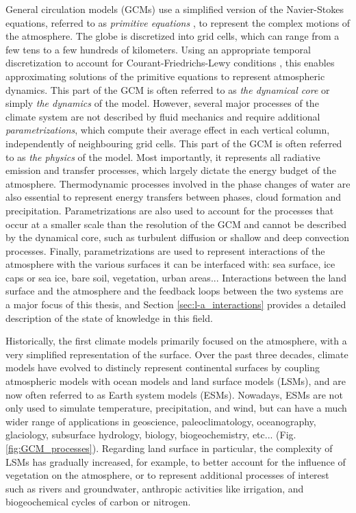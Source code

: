 General circulation models (GCMs) use a simplified version of the Navier-Stokes equations, referred to as \textit{primitive equations} \citep[initially formulated in ][]{bjerknes1910}, to represent the complex motions of the atmosphere. 
The globe is discretized into grid cells, which can range from a few tens to a few hundreds of kilometers. Using an appropriate temporal discretization to account for Courant-Friedrichs-Lewy conditions \citep{courant_partial_1967}, this enables approximating solutions of the primitive equations to represent atmospheric dynamics. This part of the GCM is often referred to as \textit{the dynamical core} or simply \textit{the dynamics} of the model. 
However, several major processes of the climate system are not described by fluid mechanics and require additional \textit{parametrizations}, which compute their average effect in each vertical column, independently of neighbouring grid cells. 
This part of the GCM is often referred to as \textit{the physics} of the model.
Most importantly, it represents all radiative emission and transfer processes, which largely dictate the energy budget of the atmosphere.
Thermodynamic processes involved in the phase changes of water are also essential to represent energy transfers between phases, cloud formation and precipitation. Parametrizations are also used to account for the processes that occur at a smaller scale than the resolution of the GCM and cannot be described by the dynamical core, such as turbulent diffusion or shallow and deep convection processes. Finally, parametrizations are used to represent interactions of the atmosphere with the various surfaces it can be interfaced with: sea surface, ice caps or sea ice, bare soil, vegetation, urban areas... 
Interactions between the land surface and the atmosphere and the feedback loops between the two systems are a major focus of this thesis, and Section \ref{sec:l-a_interactions} provides a detailed description of the state of knowledge in this field. 

Historically, the first climate models primarily focused on the atmosphere, with
a very simplified representation of the surface. Over the past three decades, climate models have evolved to distincly represent continental surfaces by coupling atmospheric models with ocean models and land surface models (LSMs), and are now often referred to as Earth system models (ESMs). Nowadays, ESMs are not only used to simulate temperature, precipitation, and wind, but can have a much wider range of applications in geoscience, paleoclimatology, oceanography, glaciology, subsurface hydrology, biology, biogeochemistry, etc... (Fig. \ref{fig:GCM_processes}).
Regarding land surface in particular, the complexity of LSMs has gradually increased, for example, to better account for the influence of vegetation on the atmosphere, or to represent additional processes of interest such as rivers and groundwater, anthropic activities like irrigation, and biogeochemical cycles of carbon or nitrogen. 

